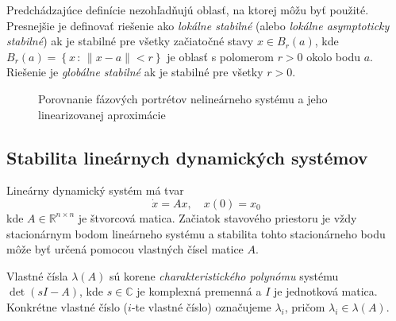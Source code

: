 \documentclass[a4paper, 10pt, ]{article}
\begin{document}
Predchádzajúce definície nezohľadňujú oblasť, na ktorej môžu byť použité. Presnejšie je definovať riešenie ako \emph{lokálne stabilné} (alebo \emph{lokálne asymptoticky stabilné}) ak je stabilné pre všetky začiatočné stavy $x \in B_r(a)$, kde $B_r(a) = \left\{ x \, : \, \| x - a \| < r \right\}$ je oblasť s polomerom $r > 0$ okolo bodu $a$. Riešenie je \emph{globálne stabilné} ak je stabilné pre všetky $r > 0$.












\begin{figure}[!ht]
	\centering

	\hspace{1cm}

	\caption{Porovnanie fázových portrétov nelineárneho systému a jeho linearizovanej aproximácie}
	\label{Porovnanie fázových portrétov nelineárneho systému a jeho linearizovanej aproximácie}
\end{figure}













\subsection{Stabilita lineárnych dynamických systémov}


Lineárny dynamický systém má tvar
\begin{equation}
	\dot{x} = A x, \quad x(0) = x_0
\end{equation}
kde $A \in \mathbb{R}^{n\times n}$ je štvorcová matica. Začiatok stavového priestoru je vždy stacionárnym bodom lineárneho systému a stabilita tohto stacionárneho bodu môže byť určená pomocou vlastných čísel matice $A$.

Vlastné čísla $\lambda(A)$ sú korene \emph{charakteristického polynómu} systému $\det(sI - A)$, kde $s \in \mathbb{C}$ je komplexná premenná a $I$ je jednotková matica. Konkrétne vlastné číslo ($i$-te vlastné číslo) označujeme $\lambda_i$, pričom $\lambda_i \in \lambda(A)$.
\end{document}
